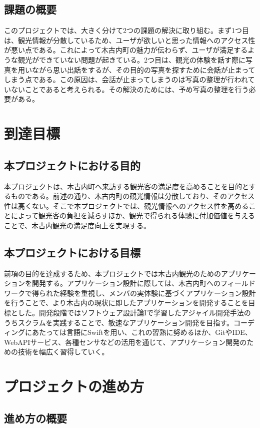 \documentclass[openany,11pt,papersize]{jsbook}
\begin{document}
\section{課題の概要}\label{sec:gaiyou}
このプロジェクトでは、大きく分けて2つの課題の解決に取り組む。まず1つ目は、観光情報が分散しているため、ユーザが欲しいと思った情報へのアクセス性が悪い点である。これによって木古内町の魅力が伝わらず、ユーザが満足するような観光ができていない問題が起きている。2つ目は、観光の体験を話す際に写真を用いながら思い出話をするが、その目的の写真を探すために会話が止まってしまう点である。この原因は、会話が止まってしまうのは写真の整理が行われていないことであると考えられる。その解決のためには、予め写真の整理を行う必要がある。


\chapter{到達目標}
\section{本プロジェクトにおける目的}
本プロジェクトは、木古内町へ来訪する観光客の満足度を高めることを目的とするものである。前述の通り、木古内町の観光情報は分散しており、そのアクセス性は高くない。そこで本プロジェクトでは、観光情報へのアクセス性を高めることによって観光客の負担を減らすほか、観光で得られる体験に付加価値を与えることで、木古内観光の満足度向上を実現する。

\section{本プロジェクトにおける目標}
前項の目的を達成するため、本プロジェクトでは木古内観光のためのアプリケーションを開発する。アプリケーション設計に際しては、木古内町へのフィールドワークで得られた経験を重視し、メンバの実体験に基づくアプリケーション設計を行うことで、より木古内の現状に即したアプリケーションを開発することを目標とした。開発段階ではソフトウェア設計論Iで学習したアジャイル開発手法のうちスクラムを実践することで、敏速なアプリケーション開発を目指す。コーディングにあたっては言語にSwiftを用い、これの習熟に努めるほか、GitやIDE、WebAPIサービス、各種センサなどの活用を通じて、アプリケーション開発のための技術を幅広く習得していく。

\chapter{プロジェクトの進め方}
\section{進め方の概要}
\end{document}
